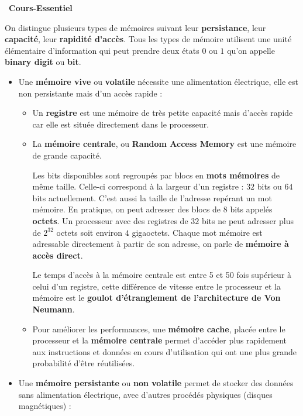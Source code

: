 \documentclass[a4paper, french, 11pt]{article}  %
\newcounter{cours}
\newenvironment{cours}[1]
{\par \medskip   \addtocounter{cours}{1} \noindent  
\begin{bclogo}[arrondi =0.1,  ombre = true, barre=none, logo=\bcbook, marge=4]{~\textbf{Cours-Essentiel} \textbf{\thecours} {\itshape #1} }  \par}
{
\end{bclogo}
 \par \bigskip }
\begin{document}
\begin{cours}{}

On distingue plusieurs types de mémoires suivant leur \textbf{persistance}, leur \textbf{capacité}, leur \textbf{rapidité d'accès}.  Tous les types de mémoire utilisent une unité élémentaire d'information qui peut prendre deux états $0$ ou $1$ qu'on appelle \textbf{binary digit} ou \textbf{bit}.

\begin{itemize}[label=]

	\item Une \textbf{mémoire vive} ou \textbf{volatile} nécessite une alimentation électrique, elle est non persistante mais d'un accès rapide :
	
	\begin{itemize}
		\item Un \textbf{registre} est une mémoire de très petite capacité mais d'accès rapide car elle est  située directement dans le processeur.
		\item La \textbf{mémoire centrale}, ou \textbf{Random Access Memory} est une mémoire de grande capacité. 
		
		
Les bits disponibles sont regroupés par blocs en \textbf{mots mémoires} de même taille. Celle-ci correspond à la largeur d'un registre : $32$ bits ou $64$ bits actuellement. C'est aussi la taille de l'adresse repérant un mot mémoire. En pratique, on peut adresser des blocs de $8$ bits appelés \textbf{octets}.  Un processeur avec des registres de  $32$ bits ne peut adresser plus de $2^{32}$ octets soit environ $4$ gigaoctets.  Chaque mot mémoire est adressable directement à partir de son adresse, on parle de \textbf{mémoire à accès direct}. 
		
		Le temps d'accès à la mémoire centrale est entre 5 et 50 fois supérieur à celui d'un registre, cette différence de vitesse entre le processeur et la mémoire est le \textbf{goulot d'étranglement de l'architecture de Von Neumann}. 
		

		\item Pour améliorer les performances, une \textbf{mémoire cache}, placée entre le processeur et la \textbf{mémoire centrale} permet d'accéder plus rapidement aux instructions et données en cours d'utilisation qui ont une plus grande probabilité d'être réutilisées.
	\end{itemize}

   \item Une \textbf{mémoire persistante} ou \textbf{non volatile} permet de stocker des données sans alimentation électrique, avec d'autres procédés physiques (disques  magnétiques) : 
   

\end{itemize}
\end{cours}
\end{document}
